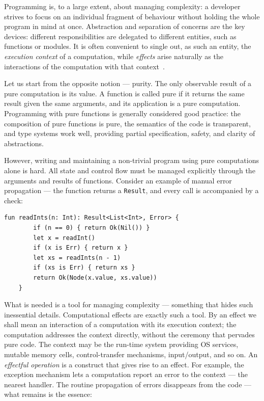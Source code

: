 \documentclass[11pt]{article}
\begin{document}
Programming is, to a large extent, about managing complexity: a developer strives to
focus on an individual fragment of behaviour without holding the whole program in mind at
once. Abstraction and separation of concerns are the key devices: different
responsibilities are delegated to different entities, such as functions or modules. It is
often convenient to single out, as such an entity, the \emph{execution context} of a
computation, while \emph{effects} arise naturally as the interactions of the computation
with that context~\cite{kiselyov2013extensible}.

Let us start from the opposite notion --- purity. The only observable result of a pure
computation is its value. A function is called pure if it returns the same result given the
same arguments, and its application is a pure computation. Programming with pure
functions is generally considered good practice: the composition of pure functions is
pure, the semantics of the code is transparent, and type systems work well, providing
partial specification, safety, and clarity of abstractions.

However, writing and maintaining a non-trivial program using pure computations alone is
hard. All state and control flow must be managed explicitly through the arguments and
results of functions. Consider an example of manual error propagation --- the function
returns a \lstinline|Result|, and every call is accompanied by a check:

\begin{lstlisting}[language=colang]
    fun readInts(n: Int): Result<List<Int>, Error> {
        if (n == 0) { return Ok(Nil()) }
        let x = readInt()
        if (x is Err) { return x }
        let xs = readInts(n - 1)
        if (xs is Err) { return xs }
        return Ok(Node(x.value, xs.value))
    }
\end{lstlisting}

What is needed is a tool for managing complexity --- something that hides such
inessential details. Computational effects are exactly such a tool. By an effect we
shall mean an interaction of a computation with its execution context; the computation
addresses the context directly, without the ceremony that pervades pure code. The
context may be the run-time system providing OS services, mutable memory cells,
control-transfer mechanisms, input/output, and so on. An \emph{effectful operation} is a
construct that gives rise to an effect. For example, the exception mechanism lets a
computation report an error to the context --- the nearest handler. The routine
propagation of errors disappears from the code --- what remains is the essence:
\end{document}
